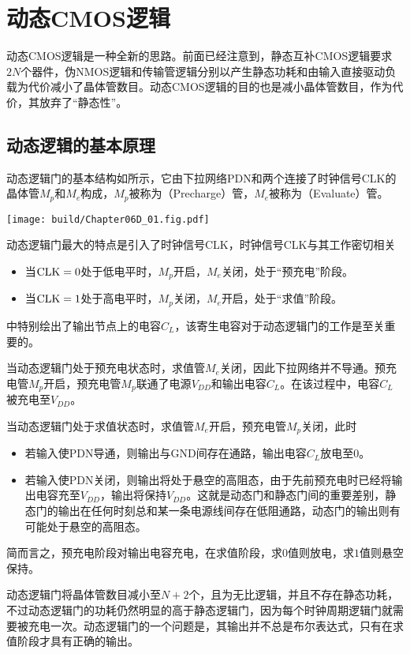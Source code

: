 \section{动态CMOS逻辑}
动态CMOS逻辑是一种全新的思路。前面已经注意到，静态互补CMOS逻辑要求$2N$个器件，伪NMOS逻辑和传输管逻辑分别以产生静态功耗和由输入直接驱动负载为代价减小了晶体管数目。动态CMOS逻辑的目的也是减小晶体管数目，作为代价，其放弃了“静态性”。

\subsection{动态逻辑的基本原理}
动态逻辑门的基本结构如所示，它由下拉网络PDN和两个连接了时钟信号CLK的晶体管$M_p$和$M_e$构成，$M_p$被称为（Precharge）管，$M_e$被称为（Evaluate）管。
\begin{Figure}[动态逻辑]
    \texttt{[image: build/Chapter06D\_01.fig.pdf]}
\end{Figure}

动态逻辑门最大的特点是引入了时钟信号CLK，时钟信号CLK与其工作密切相关
\begin{itemize}
    \item 当$\text{CLK}=0$处于低电平时，$M_p$开启，$M_e$关闭，处于“预充电”阶段。
    \item 当$\text{CLK}=1$处于高电平时，$M_p$关闭，$M_e$开启，处于“求值”阶段。
\end{itemize}

中特别绘出了输出节点上的电容$C_L$，该寄生电容对于动态逻辑门的工作是至关重要的。

当动态逻辑门处于预充电状态时，求值管$M_e$关闭，因此下拉网络并不导通。预充电管$M_p$开启，预充电管$M_p$联通了电源$V_{DD}$和输出电容$C_L$。在该过程中，电容$C_L$被充电至$V_{DD}$。

当动态逻辑门处于求值状态时，求值管$M_e$开启，预充电管$M_p$关闭，此时
\begin{itemize}
    \item 若输入使PDN导通，则输出与GND间存在通路，输出电容$C_L$放电至$0$。
    \item 若输入使PDN关闭，则输出将处于悬空的高阻态，由于先前预充电时已经将输出电容充至$V_{DD}$，输出将保持$V_{DD}$。这就是动态门和静态门间的重要差别，静态门的输出在任何时刻总和某一条电源线间存在低阻通路，动态门的输出则有可能处于悬空的高阻态。
\end{itemize}
简而言之，预充电阶段对输出电容充电，在求值阶段，求$0$值则放电，求$1$值则悬空保持。

动态逻辑门将晶体管数目减小至$N+2$个，且为无比逻辑，并且不存在静态功耗，不过动态逻辑门的功耗仍然明显的高于静态逻辑门，因为每个时钟周期逻辑门就需要被充电一次。动态逻辑门的一个问题是，其输出并不总是布尔表达式，只有在求值阶段才具有正确的输出。

